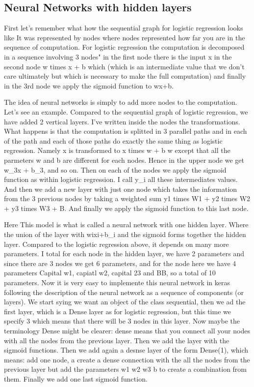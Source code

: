 \documentclass{article}
\begin{document}
\subsection{Neural Networks with hidden layers}

First let's remember what how the sequential graph for logistic regression looks like
It was represented by nodes where nodes represented how far you are in the 
sequence of computation.
For logistic regression the computation is decomposed in a sequence involving 3 nodes"
in the first node there is the input x
in the second node w times x + b which (which is an intermediate value that we don't 
care ultimately but which is necessary to make the full computation)
and finally in the 3rd node  we apply the sigmoid function to wx+b.

The idea of neural networks is simply to add more nodes to the computation. 
Let's see an example. 
Compared to the sequential graph of logistic regression, we have added 2 vertical layers.
I've written inside the nodes the transformations.
What happens is that the computation is splitted in 3 parallel paths and in each of the 
path and each of those paths do exactly the same thing as logistic regression. 
Namely x is transformed to x times w + b w except that all the parmeters w and b 
are different for each nodes. 
Hence in the upper node we get w\_3x + b\_3, and so on.
Then on each of the nodes we apply the sigmoid function as within logistic regression.
I call y\_i all these intermediates values.
And then we add a new layer with just one node which takes the information from the 3 previous nodes 
by taking a weighted sum y1 times W1 + y2 times W2 + y3 times W3 + B. 
And finally we apply the sigmoid function to this last node.

Here This model is what is called a neural network with one hidden layer. 
Where the union of the layer with wixi+b\_i and the sigmoid forms together the hidden layer. 
Compared to the logistic regression above, it depends on many more parameters. 
I total for each node in the hidden layer, we have 2 parameters and since there are 3 nodes we get 
6 parameters, and for the node here we have 4 parameters Capital w1, capiatl w2, capital 23 and BB, 
so a total of 10 parameters. 
Now it is very easy to implemente this neural network in keras following the 
description of the neural network as a sequence of components (or layers).
We start sying we want an object of the class sequential, 
then we ad the first layer, which is a Dense layer as for logistic regression, but 
this time we specify 3 which means that there will be 3 nodes in this layer.
Now maybe the terminology Dense might be clearer: dense means that you connect all your nodes 
with all the nodes from the previous layer.
Then we add the layer with the sigmoid functions. 
Then we add again a desnse layer of the form Dense(1), which means: 
add one node, a create a dense connection with the all the nodes from the previous layer  but add
the parameters w1 w2 w3 b to create a combination from them.
Finally we add one last sigmoid function.
\end{document}

